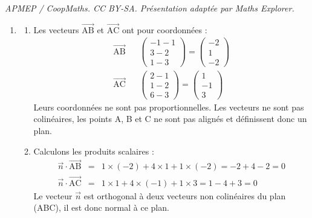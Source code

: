 \documentclass[10pt]{article}
\providecommand{\vect}[1]{\overrightarrow{#1}}
\begin{document}
\noindent\textit{APMEP / CoopMaths. CC BY-SA. Présentation adaptée par Maths Explorer.}\par\medskip
\begin{enumerate}
\item 
	\begin{enumerate}
		\item Les vecteurs $\overrightarrow{\text{AB}}$ et $\overrightarrow{\text{AC}}$ ont pour coordonnées :
\[
\begin{array}{rcl}
\overrightarrow{\text{AB}} && \begin{pmatrix} -1 - 1 \\ 3 - 2 \\ 1 - 3 \end{pmatrix} = \begin{pmatrix} -2 \\ 1 \\ -2 \end{pmatrix} \\
\overrightarrow{\text{AC}} && \begin{pmatrix} 2 - 1 \\ 1 - 2 \\ 6 - 3 \end{pmatrix} = \begin{pmatrix} 1 \\ -1 \\ 3 \end{pmatrix}
\end{array}
\]
Leurs coordonnées ne sont pas proportionnelles. Les vecteurs ne sont pas colinéaires, les points A, B et C ne sont pas alignés et définissent donc un plan.

		\item Calculons les produits scalaires :
\[
\begin{array}{rcl}
\vect{n} \cdot \vect{\text{AB}} &=& 1 \times (-2) + 4 \times 1 + 1 \times (-2) = -2 + 4 - 2 = 0 \\
\vect{n} \cdot \vect{\text{AC}} &=& 1 \times 1 + 4 \times (-1) + 1 \times 3 = 1 - 4 + 3 = 0
\end{array}
\]
Le vecteur $\vect{n}$ est orthogonal à deux vecteurs non colinéaires du plan (ABC), il est donc normal à ce plan.


\end{enumerate}
\end{enumerate}
\end{document}
